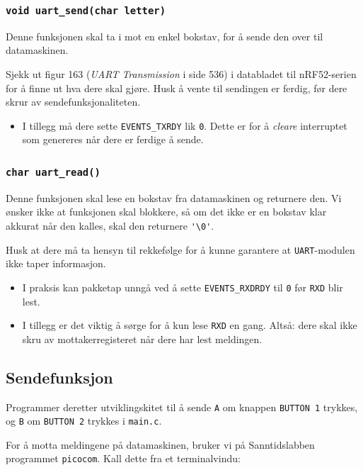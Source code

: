 \cprotect\subsubsection{\lstinline{void uart_send(char letter)}}

Denne funksjonen skal ta i mot en enkel bokstav, for å sende den over til datamaskinen.

Sjekk ut figur 163 (\textit{UART Transmission} i side 536) i databladet til nRF52-serien for å finne ut hva dere skal gjøre. Husk å vente til sendingen er ferdig, før dere skrur av sendefunksjonaliteten.

\begin{itemize}
    \item I tillegg må dere sette \verb|EVENTS_TXRDY| lik \verb|0|. Dette er for å {\it cleare} interruptet som genereres når dere er ferdige å sende.
\end{itemize}

\cprotect\subsubsection{\lstinline{char uart_read()}}

Denne funksjonen skal lese en bokstav fra datamaskinen og returnere den. Vi ønsker ikke at funksjonen skal blokkere, så om det ikke er en bokstav klar akkurat når den kalles, skal den returnere \verb|'\0'|.

Husk at dere må ta hensyn til rekkefølge for å kunne garantere at \verb|UART|-modulen ikke taper informasjon.

\begin{itemize}
    \item I praksis kan pakketap unngå ved å sette \verb|EVENTS_RXDRDY| til \verb|0| før \verb|RXD| blir lest.
    \item I tillegg er det viktig å sørge for å kun lese \verb|RXD| en gang. Altså: dere skal ikke skru av mottakerregisteret når dere har lest meldingen.
\end{itemize}
\subsection{Sendefunksjon}
Programmer deretter utviklingskitet til å sende \verb|A| om knappen \verb|BUTTON 1| trykkes, og \verb|B| om \verb|BUTTON 2| trykkes i \verb|main.c|.

For å motta meldingene på datamaskinen, bruker vi på Sanntidslabben programmet \verb|picocom|. Kall dette fra et terminalvindu:

